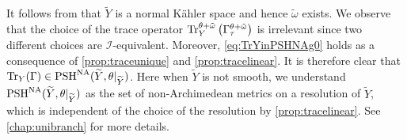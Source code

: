 It follows from \cite[Proposition~3.6]{GK20} that $\widetilde{Y}$ is a normal K\"ahler space and hence $\tilde{\omega}$ exists. We observe that the choice of the trace operator $\operatorname{Tr}_Y^{\theta+\tilde{\omega}}\left(\Gamma^{\theta+\tilde{\omega}}_{\tau}\right)$ is irrelevant since two different choices are $\mathcal{I}$-equivalent. Moreover, \eqref{eq:TrYinPSHNAg0} holds as a consequence of \cref{prop:traceunique} and \cref{prop:tracelinear}. It is therefore clear that $\operatorname{Tr}_Y(\Gamma)\in \mathrm{PSH}^{\mathrm{NA}}(\widetilde{Y},\theta|_{\widetilde{Y}})$. Here when $\widetilde{Y}$ is not smooth, we understand $\mathrm{PSH}^{\mathrm{NA}}(\widetilde{Y},\theta|_{\widetilde{Y}})$ as the set of non-Archimedean metrics on a resolution of $\widetilde{Y}$, which is independent of the choice of the resolution by \cref{prop:tracelinear}. See \cref{chap:unibranch} for more details.


